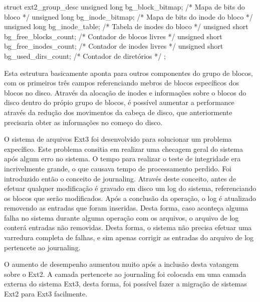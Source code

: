 struct ext2_group_desc {
    unsigned long bg_block_bitmap;       /* Mapa de bits do bloco */
    unsigned long bg_inode_bitmap;       /* Mapa de bits do inode do bloco */
    unsigned long bg_inode_table;        /* Tabela de inodes do bloco */
    unsigned short bg_free_blocks_count; /* Contador de blocos livres */
    unsigned short bg_free_inodes_count; /* Contador de inodes livres */
    unsigned short bg_used_dirs_count;   /* Contador de diretórios */
};

Esta estrutura basicamente aponta para outros componentes do grupo de blocos, com os primeiros três campos referenciando mebros de blocos específicos dos blocos no disco. Através da alocação de inodes e informações sobre o blocos do disco dentro do própio grupo de blocos, é possível aumentar a performance através da redução dos movimentos da cabeça de disco, que anteriormente precisaria obter as informações no começo do disco.

O sistema de arquivos Ext3 foi desenvolvido para solucionar um problema expecífico. Este problema consitia em realizar uma checagem geral do sistema após algum erro no sistema. O tempo para realizar o teste de integridade era incrivelmente grande, o que causava tempo de processamento perdido. Foi introduzido então o conceito de  journaling. Através deste conceito, antes de efetuar qualquer modificação é gravado em disco um log do sistema, referenciando os blocos que serão modificados. Após a conclusão da operação, o log é atualizado removendo as entradas que foram inseridas. Desta forma, caso aconteça alguma falha no sistema durante alguma operação com os arquivos, o arquivo de log conterá entradas não removidas. Desta forma, o sistema não precisa efetuar uma varredura completa de falhas, e sim apenas corrigir as entradas do arquivo de log  pertencete ao journaling.

O aumento de desempenho aumentou muito após a inclusão desta vatangem sobre o Ext2. A camada pertencete ao journaling foi colocada em uma camada externa do sistema Ext3, desta forma, foi possível fazer a migração de sistemas Ext2 para Ext3 facilmente.
